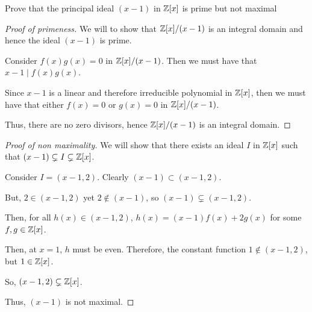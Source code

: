 \documentclass[../hw8]{subfiles}
\begin{document}
\begin{problem}
Prove that the principal ideal $(x-1)$ in  $\mathbb{Z}[x]$ is prime but not maximal
\end{problem}
\begin{proof}[Proof of primeness]
	We will to show that $\mathbb{Z}[x] / (x-1)$ is an integral domain and hence the ideal $(x-1)$ is prime.

	Consider  $f(x)g(x)=0$ in $\mathbb{Z}[x] / (x-1)$.
	Then we must have that $x-1 \mid f(x)g(x) $.

	Since $x-1$ is a linear and therefore irreducible polynomial in  $\mathbb{Z}[x]$,
	then we must have that either $f(x)=0$ or  $g(x)=0$ in $\mathbb{Z}[x] / (x-1)$.

	Thus, there are no zero divisors, hence $\mathbb{Z}[x] / (x-1)$  is an integral domain.
\end{proof}
\begin{proof}[Proof of non maximality]
	We will show that there exists an ideal $I$ in $\mathbb{Z}[x]$ such that $(x-1)\subsetneq I\subsetneq \mathbb{Z}[x]$.

	Consider $I=(x-1,2)$.
	Clearly  $(x-1)\subset (x-1,2)$.

	But, $2\in (x-1,2)$ yet $2\not\in (x-1)$, so $(x-1)\subsetneq (x-1,2)$.

	Then, for all $h(x)\in (x-1,2)$, $h(x)=(x-1)f(x)+2g(x)$ for some  $f,g\in \mathbb{Z}[x]$.

	Then, at $x=1$, $h$ must be even.
	Therefore, the constant function $1\not\in (x-1,2)$, but $1 \in \mathbb{Z}[x]$.

	So, $(x-1,2)\subsetneq \mathbb{Z}[x]$.

	Thus, $(x-1)$ is not maximal.
\end{proof}
\end{document}
